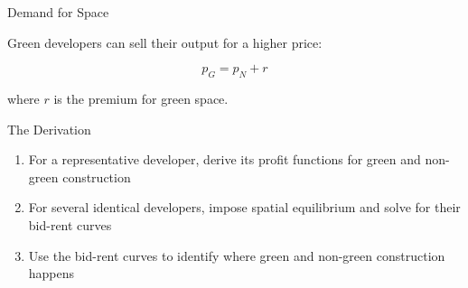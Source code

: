 \documentclass[11pt]{beamer}
\begin{document}
\begin{frame}{Demand for Space}

Green developers can sell their output for a higher price: 

$$p_G = p_N + r$$

where $r$ is the premium for green space.
\end{frame}


%
%
%
%
%
%
%
%


\begin{frame}{The Derivation}

\begin{enumerate}
	\item For a representative developer, derive its profit functions for green and non-green construction
	\vfill
	
	\item For several identical developers, impose spatial equilibrium and solve for their bid-rent curves
	\vfill
	
	\item Use the bid-rent curves to identify where green and non-green construction happens
\end{enumerate}


\end{frame}


\end{document}
